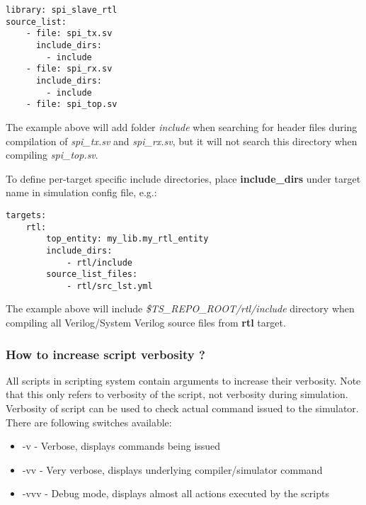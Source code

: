 \documentclass{tropic_design_spec}
\begin{document}
\begin{lstlisting}
library: spi_slave_rtl
source_list:
    - file: spi_tx.sv
      include_dirs:
        - include
    - file: spi_rx.sv
      include_dirs:
        - include
    - file: spi_top.sv
\end{lstlisting}

The example above will add folder \textit{include} when searching for header files
during compilation of \textit{spi_tx.sv} and \textit{spi_rx.sv}, but it will not
search this directory when compiling \textit{spi_top.sv}.


To define per-target specific include directories, place \textbf{include_dirs} under
target name in simulation config file, e.g.:

\begin{lstlisting}
targets:
    rtl:
        top_entity: my_lib.my_rtl_entity
        include_dirs:
            - rtl/include
        source_list_files:
            - rtl/src_lst.yml
\end{lstlisting}

The example above will include \textit{\$TS_REPO_ROOT/rtl/include} directory when
compiling all Verilog/System Verilog source files from \textbf{rtl} target.


\subsubsection{How to increase script verbosity ?}
\label{sec:how-to-increase-script-verbosity}

All scripts in scripting system contain arguments to increase their verbosity. Note that
this only refers to verbosity of the script, not verbosity during simulation. Verbosity
of script can be used to check actual command issued to the simulator.
There are following switches available:
\begin{itemize}
    \item{-v   - Verbose, displays commands being issued}
    \item{-vv  - Very verbose, displays underlying compiler/simulator command}
    \item{-vvv - Debug mode, displays almost all actions executed by the scripts}
\end{itemize}
\end{document}
